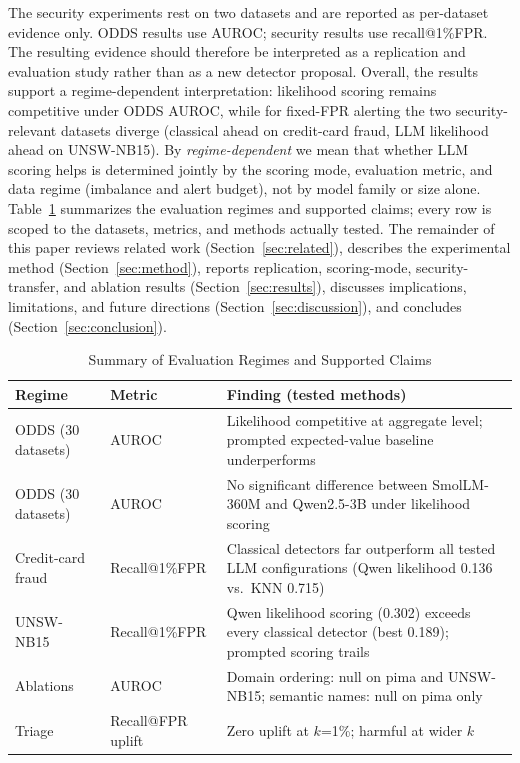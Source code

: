 \documentclass[conference]{IEEEtran}
\begin{document}
The security experiments rest on two datasets and are reported as per-dataset evidence only.
ODDS results use AUROC; security results use recall@1\%FPR.
The resulting evidence should therefore be interpreted as a replication and evaluation study rather than as a new detector proposal.
Overall, the results support a regime-dependent interpretation: likelihood scoring remains competitive under ODDS AUROC, while for fixed-FPR alerting the two security-relevant datasets diverge (classical ahead on credit-card fraud, LLM likelihood ahead on UNSW-NB15).
By \emph{regime-dependent} we mean that whether LLM scoring helps is determined jointly by the scoring mode, evaluation metric, and data regime (imbalance and alert budget), not by model family or size alone.
Table~\ref{tab:regime} summarizes the evaluation regimes and supported claims; every row is scoped to the datasets, metrics, and methods actually tested.
The remainder of this paper reviews related work (Section~\ref{sec:related}), describes the experimental method (Section~\ref{sec:method}), reports replication, scoring-mode, security-transfer, and ablation results (Section~\ref{sec:results}), discusses implications, limitations, and future directions (Section~\ref{sec:discussion}), and concludes (Section~\ref{sec:conclusion}).

\begin{table}[t]
\caption{Summary of Evaluation Regimes and Supported Claims}
\label{tab:regime}
\begin{center}
\renewcommand{\arraystretch}{1.2}
\small
\begin{tabular}{|p{1.5in}|p{1.1in}|p{3.6in}|}
\hline
\textbf{Regime} & \textbf{Metric} & \textbf{Finding (tested methods)} \\
\hline
ODDS (30 datasets) & AUROC & Likelihood competitive at aggregate level; prompted expected-value baseline underperforms \\
ODDS (30 datasets) & AUROC & No significant difference between SmolLM-360M and Qwen2.5-3B under likelihood scoring \\
Credit-card fraud & Recall@1\%FPR & Classical detectors far outperform all tested LLM configurations (Qwen likelihood 0.136 vs.\ KNN 0.715) \\
UNSW-NB15 & Recall@1\%FPR & Qwen likelihood scoring (0.302) exceeds every classical detector (best 0.189); prompted scoring trails \\
Ablations & AUROC & Domain ordering: null on pima and UNSW-NB15; semantic names: null on pima only \\
Triage & Recall@FPR uplift & Zero uplift at $k$=1\%; harmful at wider $k$ \\
\hline
\end{tabular}
\end{center}
\end{table}
\end{document}
